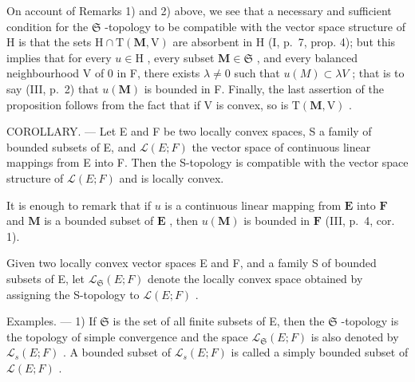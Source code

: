 On account of Remarks 1) and 2) above, we see that a necessary and sufficient condition for the \(\mathfrak{S}\) -topology to be compatible with the vector space structure of H is that the sets \(\mathrm{H} \cap \mathrm{T}(\mathbf{M}, \mathrm{V})\) are absorbent in H (I, p.~7, prop. 4); but this implies that for every \(u \in \mathrm{H}\) , every subset \(\mathbf{M} \in \mathfrak{S}\) , and every balanced neighbourhood V of 0 in F, there exists \(\lambda \neq 0\) such that \(u(M) \subset \lambda V\) ; that is to say (III, p.~2) that \(u(\mathbf{M})\) is bounded in F. Finally, the last assertion of the proposition follows from the fact that if V is convex, so is \(\mathrm{T}(\mathbf{M}, \mathrm{V})\) .

COROLLARY. --- Let E and F be two locally convex spaces, S a family of bounded subsets of E, and \(\mathcal{L}(E; F)\) the vector space of continuous linear mappings from E into F. Then the S-topology is compatible with the vector space structure of \(\mathcal{L}(E; F)\) and is locally convex.

It is enough to remark that if \(u\) is a continuous linear mapping from \(\mathbf{E}\) into \(\mathbf{F}\) and \(\mathbf{M}\) is a bounded subset of \(\mathbf{E}\) , then \(u(\mathbf{M})\) is bounded in \(\mathbf{F}\) (III, p.~4, cor. 1).

Given two locally convex vector spaces E and F, and a family S of bounded subsets of E, let \(\mathcal{L}_{\mathfrak{S}}(E;F)\) denote the locally convex space obtained by assigning the S-topology to \(\mathcal{L}(E;F)\) .

Examples. --- 1) If \(\mathfrak{S}\) is the set of all finite subsets of E, then the \(\mathfrak{S}\) -topology is the topology of simple convergence and the space \(\mathcal{L}_{\mathfrak{S}}(E; F)\) is also denoted by \(\mathcal{L}_s(E; F)\) . A bounded subset of \(\mathcal{L}_s(E; F)\) is called a simply bounded subset of \(\mathcal{L}(E; F)\) .

